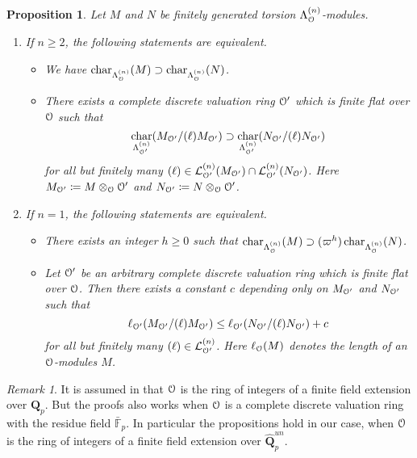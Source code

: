 \documentclass[leqno]{amsart}
\newtheorem{prop}[thm]{Proposition}
\theoremstyle{definition}
\theoremstyle{remark}
\newtheorem{rem}[thm]{Remark}
\newcommand{\eo}{\EuScript{O}}
\newcommand{\fF}{\mathbb{F}} %
\newcommand{\Q}{{\mathbf{Q}}}
\newcommand{\Qp}{\mathbf{Q}_p}
\DeclareMathOperator{\car}{char}
\newcommand{\lin}[1]{\mathcal{L}^{(#1)}}
\newcommand{\Lda}[1]{\Lambda^{(#1)}}
\begin{document}
\begin{prop}
Let $M$ and $N$ be finitely generated torsion 
$\Lda{n}_{\eo}$-modules.
\begin{enumerate}
\item If $n\geq 2$, the following statements are equivalent.
\begin{itemize}
    \item We have 
    $\car_{\Lda{n}_{\eo}}(M)\supset\car_{\Lda{n}_{\eo}}(N)$.
    \item There exists a complete discrete valuation ring
    $\eo'$ which is finite flat over $\eo$ such that
    \[
    \car_{\Lda{n}_{\eo'}}(M_{\eo'}/(\ell)M_{\eo'})\supset
    \car_{\Lda{n}_{\eo'}}(N_{\eo'}/(\ell)N_{\eo'})
    \]
    for all but finitely many
    $(\ell)\in \lin{n}_{\eo'}(M_{\eo'})\cap\lin{n}_{\eo'}(N_{\eo'})$.
    Here $M_{\eo'}\coloneqq M\otimes_{\eo}\eo'$ 
    and $N_{\eo'}\coloneqq N\otimes_{\eo}\eo'$.
\end{itemize}
\item If $n=1$, the following statements are equivalent.
\begin{itemize}
    \item There exists an integer $h\geq 0$ such that
    $\car_{\Lda{n}_{\eo}}(M)\supset(\varpi^h)\car_{\Lda{n}_{\eo}}(N)$.
    \item Let $\eo'$ be an arbitrary complete discrete valuation
    ring which is finite flat over $\eo$. 
    Then there exists a constant $c$ depending only on 
    $M_{\eo'}$ and $N_{\eo'}$ such that 
    \[
        \ell_{\eo'}(M_{\eo'}/(\ell)M_{\eo'})\leq
        \ell_{\eo'}(N_{\eo'}/(\ell)N_{\eo'})+c
    \]
    for all but finitely many $(\ell)\in \lin{n}_{\eo'}$.
    Here  $\ell_{\eo}(M)$ denotes the length of an $\eo$-modules $M$.
\end{itemize}
\end{enumerate}
    
\end{prop}

\begin{rem}
It is assumed in \cite{Och05} that
$\eo$ is the ring of integers
of a finite field extension over $\Qp$.
But the proofs also works when
$\eo$ is a complete discrete valuation ring 
with the residue field $\bar{\fF}_p$.
In particular the propositions hold in our case,
when $\eo$ is the ring of integers
of a finite field extension over $\widehat{\Q}_p^{un}$.
\end{rem}
\end{document}
